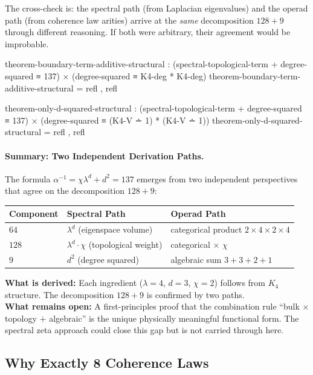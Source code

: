 \documentclass[11pt,a4paper]{book}
\begin{document}
The cross-check is: the spectral path (from Laplacian eigenvalues) and the operad path
(from coherence law arities) arrive at the \emph{same} decomposition $128 + 9$ through
different reasoning. If both were arbitrary, their agreement would be improbable.

\begin{code}
theorem-boundary-term-additive-structural : 
  (spectral-topological-term + degree-squared ≡ 137) ×
  (degree-squared ≡ K4-deg * K4-deg)
theorem-boundary-term-additive-structural = refl , refl

theorem-only-d-squared-structural : 
  (spectral-topological-term + degree-squared ≡ 137) ×
  (degree-squared ≡ (K4-V ∸ 1) * (K4-V ∸ 1))
theorem-only-d-squared-structural = refl , refl
\end{code}

\paragraph{Summary: Two Independent Derivation Paths.}

The formula $\alpha^{-1} = \chi \lambda^d + d^2 = 137$ emerges from two
independent perspectives that agree on the decomposition $128 + 9$:

\begin{center}
\begin{tabular}{lll}
\hline
\textbf{Component} & \textbf{Spectral Path} & \textbf{Operad Path} \\
\hline
$64$  & $\lambda^d$ (eigenspace volume) & categorical product $2 \times 4 \times 2 \times 4$ \\
$128$ & $\lambda^d \cdot \chi$ (topological weight) & categorical $\times$ $\chi$ \\
$9$   & $d^2$ (degree squared) & algebraic sum $3 + 3 + 2 + 1$ \\
\hline
\end{tabular}
\end{center}

\noindent\textbf{What is derived:} Each ingredient ($\lambda = 4$, $d = 3$, $\chi = 2$)
follows from $K_4$ structure. The decomposition $128 + 9$ is confirmed by two paths.\\
\textbf{What remains open:} A first-principles proof that the combination rule
``bulk $\times$ topology $+$ algebraic'' is the unique physically meaningful
functional form. The spectral zeta approach could close this gap but is not
carried through here.

\subsection{Why Exactly 8 Coherence Laws}
\label{sec:why-8-laws}
\end{document}
